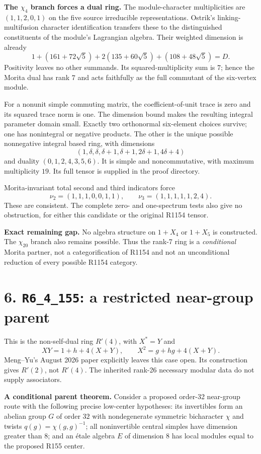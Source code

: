 \documentclass[11pt,a4paper]{article}
\newcommand{\R}[1]{\texttt{#1}}
\begin{document}
\textbf{The $\chi_4$ branch forces a dual ring.} The module-character multiplicities are $(1,1,2,0,1)$ on the five source irreducible representations. Ostrik's linking-multifusion character identification transfers these to the distinguished constituents of the module's Lagrangian algebra. Their weighted dimension is already
\[
1+(161+72\sqrt5)+2(135+60\sqrt5)+(108+48\sqrt5)=D.
\]
Positivity leaves no other summands. Its squared-multiplicity sum is $7$; hence the Morita dual has rank $7$ and acts faithfully as the full commutant of the six-vertex module.

For a nonunit simple commuting matrix, the coefficient-of-unit trace is zero and its squared trace norm is one. The dimension bound makes the resulting integral parameter domain small. Exactly two orthonormal six-element choices survive; one has nonintegral or negative products. The other is the unique possible nonnegative integral based ring, with dimensions
\[
\boxed{(1,\delta,\delta,\delta+1,\delta+1,2\delta+1,4\delta+4)}
\]
and duality $(0,1,2,4,3,5,6)$. It is simple and noncommutative, with maximum multiplicity $19$. Its full tensor is supplied in the proof directory.

Morita-invariant total second and third indicators force
\[
\nu_2=(1,1,1,0,0,1,1),\qquad
\nu_3=(1,1,1,1,1,2,4).
\]
These are consistent. The complete zero- and one-spectrum tests also give no obstruction, for either this candidate or the original R1154 tensor.

\textbf{Exact remaining gap.} No algebra structure on $1+X_4$ or $1+X_5$ is constructed. The $\chi_{20}$ branch also remains possible. Thus the rank-7 ring is a \emph{conditional} Morita partner, not a categorification of R1154 and not an unconditional reduction of every possible R1154 category.

\newpage
\section*{6. \R{R6\_4\_155}: a restricted near-group parent}
This is the non-self-dual ring $R'(4)$, with $X^*=Y$ and
\[
XY=1+h+4(X+Y),\qquad X^2=g+hg+4(X+Y).
\]
Meng--Yu's August 2026 paper explicitly leaves this case open. Its construction gives $R'(2)$, not $R'(4)$. The inherited rank-26 necessary modular data do not supply associators.

\textbf{A conditional parent theorem.} Consider a proposed order-32 near-group route with the following precise low-center hypotheses: its invertibles form an abelian group $G$ of order $32$ with nondegenerate symmetric bicharacter $\chi$ and twists $q(g)=\chi(g,g)^{-1}$; all noninvertible central simples have dimension greater than $8$; and an étale algebra $E$ of dimension $8$ has local modules equal to the proposed R155 center.
\end{document}
